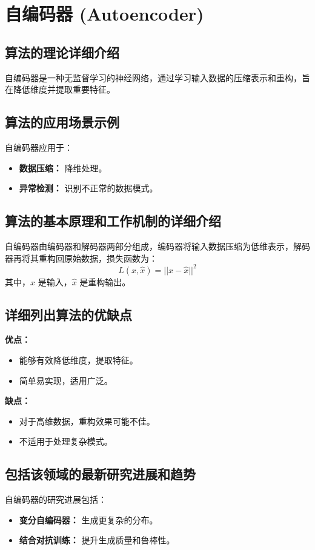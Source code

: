 \section{自编码器 (Autoencoder)}
\subsection*{算法的理论详细介绍}
自编码器是一种无监督学习的神经网络，通过学习输入数据的压缩表示和重构，旨在降低维度并提取重要特征。

\subsection*{算法的应用场景示例}
自编码器应用于：
\begin{itemize}
    \item \textbf{数据压缩：} 降维处理。
    \item \textbf{异常检测：} 识别不正常的数据模式。
\end{itemize}

\subsection*{算法的基本原理和工作机制的详细介绍}
自编码器由编码器和解码器两部分组成，编码器将输入数据压缩为低维表示，解码器再将其重构回原始数据，损失函数为：
\[
    L(x, \hat{x}) = || x - \hat{x} ||^2
\]
其中，\(x\) 是输入，\(\hat{x}\) 是重构输出。

\subsection*{详细列出算法的优缺点}
\textbf{优点：}
\begin{itemize}
    \item 能够有效降低维度，提取特征。
    \item 简单易实现，适用广泛。
\end{itemize}

\textbf{缺点：}
\begin{itemize}
    \item 对于高维数据，重构效果可能不佳。
    \item 不适用于处理复杂模式。
\end{itemize}

\subsection*{包括该领域的最新研究进展和趋势}
自编码器的研究进展包括：
\begin{itemize}
    \item \textbf{变分自编码器：} 生成更复杂的分布。
    \item \textbf{结合对抗训练：} 提升生成质量和鲁棒性。
\end{itemize}
